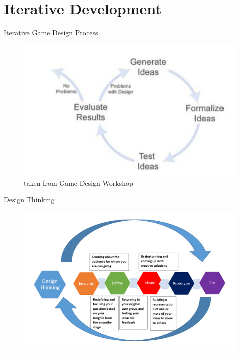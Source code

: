\part{Iterative Development}
\frame{\partpage}

\begin{frame}{Iterative Game Design Process}
	\begin{figure}
		\includegraphics[width=1.0\textwidth,height=0.7\textheight]{iterative_game_design}
		\caption{taken from Game Design Workshop}
		\label{fig:iter1}
	\end{figure}
\end{frame}


\begin{frame}{Design Thinking}
	\begin{figure}
		\includegraphics[width=1.0\textwidth, height=0.7\textheight]{design_thinking}
		\label{fig:design_thinking1}
	\end{figure}	
\end{frame}

